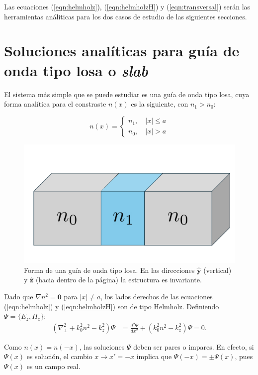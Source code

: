 Las ecuaciones (\ref{eqn:helmholz}), (\ref{eqn:helmholzH}) y (\ref{eqn:transversal}) serán las herramientas análiticas para los dos casos de estudio de las siguientes secciones.
\section{Soluciones analíticas para guía de onda tipo losa o \textit{slab}}

El sistema más simple que se puede estudiar es una guía de onda tipo losa, cuya forma analítica para el constraste $n(x)$ es la siguiente, con $n_1 > n_0$:

\begin{equation*}
	n(x) = \left\{\begin{matrix}
	n_1, \quad |x| \le a
	\\
	n_0, \quad |x| > a
 	\end{matrix}\right.
\end{equation*}

\begin{figure}[H]
	\centering
	\includegraphics[width=0.6\linewidth]{media/slab.pdf}
	\caption[Forma de una guía de onda tipo losa.]{Forma de una guía de onda tipo losa. En las direcciones $\mathbf{\hat{y}}$ (vertical) y $\mathbf{\hat{z}}$ (hacia dentro de la página) la estructura es invariante.}
\end{figure}

Dado que $\nabla n^2 = \textbf{0}$ para $|x| \neq a$, los lados derechos de las ecuaciones (\ref{eqn:helmholz}) y (\ref{eqn:helmholzH}) son de tipo Helmholz. Definiendo $\Psi = \{E_z, H_z\} $:
\begin{align*}
	(\nabla_\perp^2  + k_0^2n^2 - k_z^2) \Psi  &=  \frac{d^2\Psi}{dx^2} + (k_0^2n^2 - k_z^2) \Psi  = 0.
\end{align*}

Como $n(x)=n(-x)$, las soluciones $\Psi$ deben ser pares o impares. En efecto, si $\Psi(x)$ es solución, el cambio $x\to x'=-x$ implica que $\Psi(-x)=\pm \Psi(x)$, pues $\Psi(x)$ es un campo real.

